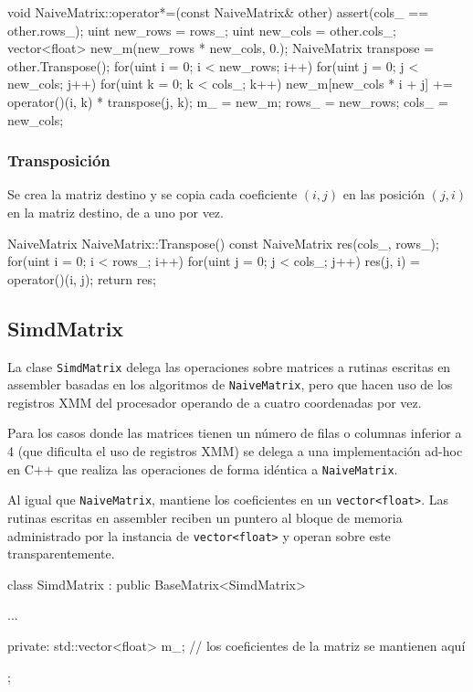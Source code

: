\documentclass[a4paper, 10pt, twoside]{article}
\newcommand{\cc}[1]{\texttt{#1}}
\begin{document}
\begin{code}
  void NaiveMatrix::operator*=(const NaiveMatrix& other) {
    assert(cols_ == other.rows_);
    uint new_rows = rows_;
    uint new_cols = other.cols_;
    vector<float> new_m(new_rows * new_cols, 0.);
    NaiveMatrix transpose = other.Transpose();
    for(uint i = 0; i < new_rows; i++) {
      for(uint j = 0; j < new_cols; j++) {
        for(uint k = 0; k < cols_; k++) {
          new_m[new_cols * i + j] += operator()(i, k) * transpose(j, k);
        }
      }
    }
    m_ = new_m;
    rows_ = new_rows;
    cols_ = new_cols;
  }
\end{code}


\subsubsection{Transposición}

Se crea la matriz destino y se copia cada coeficiente $(i,j)$ en las posición
$(j,i)$ en la matriz destino, de a uno por vez.

\begin{code}
  NaiveMatrix NaiveMatrix::Transpose() const {
    NaiveMatrix res(cols_, rows_);
    for(uint i = 0; i < rows_; i++) {
      for(uint j = 0; j < cols_; j++) {
        res(j, i) = operator()(i, j);
      }
    }
    return res;
  }
\end{code}


\subsection{SimdMatrix}

La clase \cc{SimdMatrix} delega las operaciones sobre matrices a rutinas
escritas en assembler basadas en los algoritmos de \cc{NaiveMatrix}, pero que
hacen uso de los registros XMM del procesador operando de a cuatro coordenadas
por vez.

Para los casos donde las matrices tienen un número de filas o columnas inferior
a 4 (que dificulta el uso de registros XMM) se delega a una implementación
ad-hoc en C++ que realiza las operaciones de forma idéntica a \cc{NaiveMatrix}.

Al igual que \cc{NaiveMatrix}, mantiene los coeficientes en un
\cc{vector<float>}. Las rutinas escritas en assembler reciben un puntero al
bloque de memoria administrado por la instancia de \cc{vector<float>} y operan
sobre este transparentemente.

\begin{code}
  class SimdMatrix : public BaseMatrix<SimdMatrix> {
    ...

   private:
    std::vector<float> m_;  // los coeficientes de la matriz se mantienen aquí
  };
\end{code}
\end{document}
